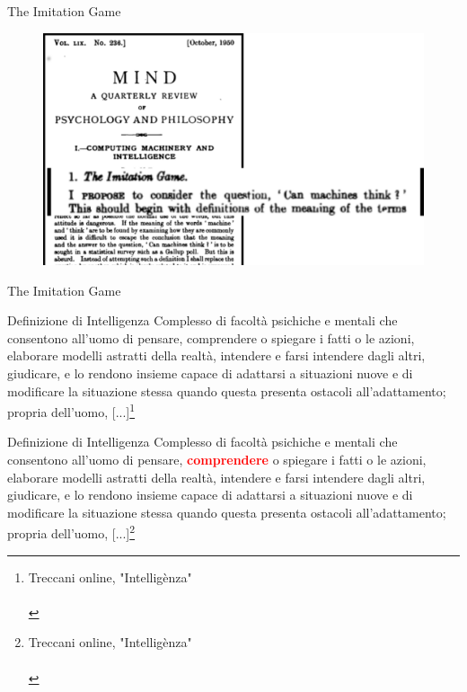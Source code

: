 \documentclass{beamer}
\begin{document}
\begin{frame}{The Imitation Game}
    \begin{figure}
        \centering
        \includegraphics[width=0.9\linewidth]{imgs/AI-Sviluppi-Sfide-Opportunita.png}
    \end{figure}
\end{frame}

\begin{frame}{The Imitation Game}
    \begin{figure}
        \centering
    \end{figure}
\end{frame}

\begin{frame}{Definizione di Intelligenza}
Complesso di facoltà psichiche e mentali che consentono all’uomo di pensare, comprendere o spiegare i fatti o le azioni, elaborare modelli astratti della realtà, intendere e farsi intendere dagli altri, giudicare, e lo rendono insieme capace di adattarsi a situazioni nuove e di modificare la situazione stessa quando questa presenta ostacoli all’adattamento; propria dell’uomo, [...]\footnote[1]{Treccani online, "Intellig\`enza"\\ \ \\}
\end{frame}

\begin{frame}{Definizione di Intelligenza}
Complesso di facoltà psichiche e mentali che consentono all’uomo di pensare, \textcolor{red}{\textbf{comprendere}} o spiegare i fatti o le azioni, elaborare modelli astratti della realtà, intendere e farsi intendere dagli altri, giudicare, e lo rendono insieme capace di adattarsi a situazioni nuove e di modificare la situazione stessa quando questa presenta ostacoli all’adattamento; propria dell’uomo, [...]\footnote[1]{Treccani online, "Intellig\`enza"\\ \ \\}
\end{frame}
\end{document}
